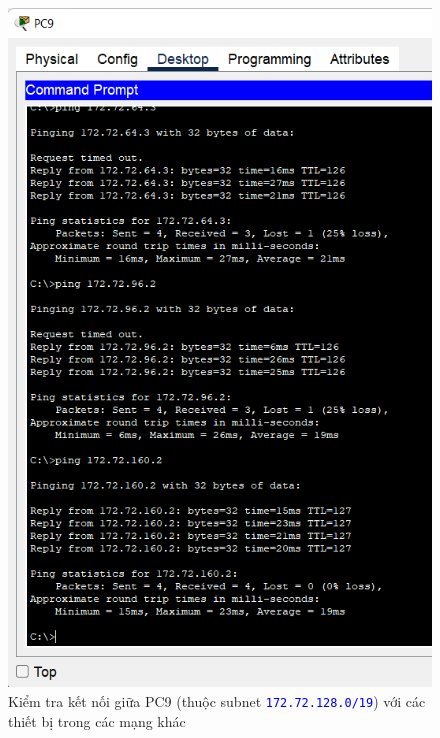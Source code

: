 \begin{enumerate}
\begin{enumerate}
\begin{figure}[H]
\begin{center}
\includegraphics[scale=.5]{../figures/p2/test-ping-10}
\end{center}
\caption{Kiểm tra kết nối giữa PC9 (thuộc subnet \texttt{\textcolor{blue}{172.72.128.0/19}}) với các thiết bị trong các mạng khác}
\end{figure}


\end{enumerate}
\end{enumerate}
